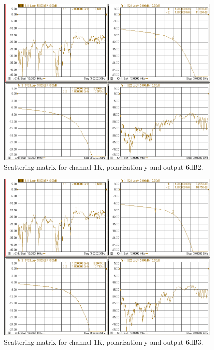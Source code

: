 \documentclass[12pt,a4paper,oneside]{article}
\begin{document}
\begin{figure}[H]
\centering
\includegraphics[width=0.9\linewidth]{VNA_results/1Ky_6dB2.png}
\caption{Scattering matrix for channel 1K, polarization y and output 6dB2.}
\label{fig:1Ky_6dB2}
\end{figure}


\begin{figure}[H]
\centering
\includegraphics[width=0.9\linewidth]{VNA_results/1Ky_6dB3.png}
\caption{Scattering matrix for channel 1K, polarization y and output 6dB3.}
\label{fig:1Ky_6dB3}
\end{figure}
\end{document}
